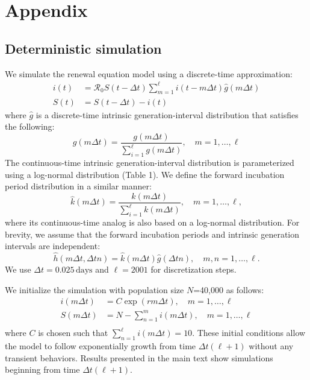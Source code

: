\documentclass[12pt]{article}
\newcommand{\Rx}[1]{\ensuremath{{\mathcal R}_{#1}}\xspace}
\newcommand{\Ro}{\Rx{0}}
\begin{document}
\pagebreak

\section{Appendix}

\subsection{Deterministic simulation}

We simulate the renewal equation model using a discrete-time approximation:
\begin{equation}
\begin{aligned}
i(t) &= \Ro S(t-\Delta t) \sum_{m=1}^{\ell} i(t-m \Delta t) \hat{g}(m \Delta t) \\
S(t) &= S(t-\Delta t) - i(t)
\end{aligned}
\end{equation}
where $\hat{g}$ is a discrete-time intrinsic generation-interval distribution that satisfies the following:
\begin{equation}
\hat{g}(m \Delta t) = \frac{g(m \Delta t)}{\sum_{i=1}^\ell g(m \Delta t)}, \quad m=1, \dots, \ell
\end{equation}
The continuous-time intrinsic generation-interval distribution is parameterized using a log-normal distribution (Table 1). We define the forward incubation period distribution in a similar manner:
\begin{equation}
\hat{k}(m \Delta t) = \frac{k(m \Delta t)}{\sum_{i=1}^\ell k(m \Delta t)}, \quad m=1, \dots, \ell,
\end{equation}
where its continuous-time analog is also based on a log-normal distribution.
For brevity, we assume that the forward incubation periods and intrinsic generation intervals are independent:
\begin{equation}
\hat{h}(m \Delta t, \Delta t n) = \hat{k}(m \Delta t)\hat{g}(\Delta t n), \quad m,n=1, \dots, \ell.
\end{equation}
We use $\Delta t = 0.025\,\textrm{days}$ and $\ell=2001$ for discretization steps.

We initialize the simulation with population size $N$=40,000 as follows:
\begin{equation}
\begin{aligned}
i(m \Delta t) &= C \exp(r m \Delta t), \quad m=1, \dots, \ell\\
S(m \Delta t) &= N - \sum_{n=1}^m i(m \Delta t), \quad m=1, \dots, \ell\\
\end{aligned}
\end{equation}
where $C$ is chosen such that $\sum_{n=1}^\ell i(m \Delta t)=10$.
These initial conditions allow the model to follow exponentially growth from time $\Delta t (\ell + 1)$ without any transient behaviors.
Results presented in the main text show simulations beginning from time $\Delta t (\ell + 1)$.
\end{document}
